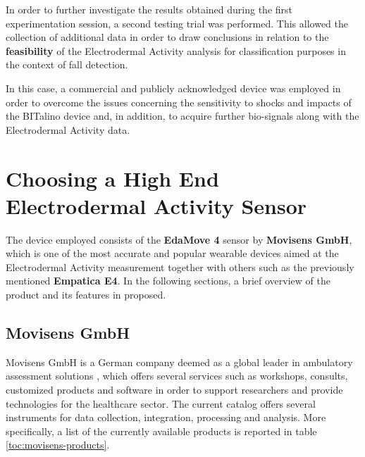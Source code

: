 \label{ch:collection}

%
%

In order to further investigate the results obtained during the first experimentation session, a second testing trial was performed. This allowed the collection of additional data in order to draw conclusions in relation to the \textbf{feasibility} of the Electrodermal Activity analysis for classification purposes in the context of fall detection.

In this case, a commercial and publicly acknowledged device was employed in order to overcome the issues concerning the sensitivity to shocks and impacts of the BITalino device and, in addition, to acquire further bio-signals along with the Electrodermal Activity data.

\section{Choosing a High End Electrodermal Activity Sensor}\label{sec:movisens}

The device employed consists of the \textbf{EdaMove 4} sensor by \textbf{Movisens GmbH}, which is one of the most accurate and popular wearable devices aimed at the Electrodermal Activity measurement together with others such as the previously mentioned \textbf{Empatica E4}. In the following sections, a brief overview of the product and its features in proposed.

\subsection{Movisens GmbH}\label{subsec:movisens-company}

Movisens GmbH is a German company deemed as a global leader in ambulatory assessment solutions \cite{movisens}, which offers several services such as workshops, consults, customized products and software in order to support researchers and provide technologies for the healthcare sector.
The current catalog offers several instruments for data collection, integration, processing and analysis. More specifically, a list of the currently available products is reported in table \ref{toc:movisens-products}.

